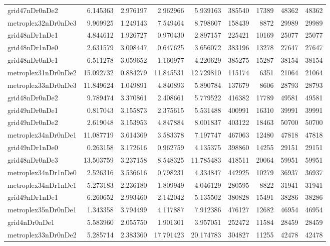 \begin{longtable}{|l|r|r|r|r|r|r|r|r|}
grid47nDr0nDe2 & 6.145363 & 2.976197 & 2.962966 & 5.939163 & 385540 & 17389 & 48362 & 48362 \\
metroplex32nDr0nDe3 & 9.969925 & 1.249143 & 7.549464 & 8.798607 & 158439 & 8872 & 29989 & 29989 \\
grid48nDr1nDe1 & 4.844612 & 1.926727 & 0.970430 & 2.897157 & 225421 & 10169 & 25077 & 25077 \\
grid48nDr1nDe0 & 2.631579 & 3.008447 & 0.647625 & 3.656072 & 383196 & 13278 & 27647 & 27647 \\
grid48nDr0nDe1 & 6.511278 & 3.059652 & 1.160977 & 4.220629 & 385275 & 15287 & 38154 & 38154 \\
metroplex31nDr0nDe2 & 15.092732 & 0.884279 & 11.845531 & 12.729810 & 115174 & 6351 & 21064 & 21064 \\
metroplex33nDr0nDe3 & 11.849624 & 1.049891 & 4.840893 & 5.890784 & 137679 & 8606 & 28793 & 28793 \\
grid48nDr0nDe2 & 9.789474 & 3.370861 & 2.408661 & 5.779522 & 416382 & 17789 & 49581 & 49581 \\
grid49nDr0nDe1 & 0.817043 & 3.155873 & 2.375615 & 5.531488 & 400991 & 16310 & 39991 & 39991 \\
grid49nDr0nDe2 & 2.619048 & 3.153953 & 4.847884 & 8.001837 & 403122 & 18463 & 50700 & 50700 \\
metroplex34nDr0nDe1 & 11.087719 & 3.614369 & 3.583378 & 7.197747 & 467063 & 12480 & 47818 & 47818 \\
grid49nDr1nDe0 & 0.263158 & 3.172616 & 0.962759 & 4.135375 & 398860 & 14255 & 29151 & 29151 \\
grid48nDr0nDe3 & 13.503759 & 3.237158 & 8.548325 & 11.785483 & 418511 & 20064 & 59951 & 59951 \\
metroplex34nDr1nDe0 & 2.526316 & 3.536616 & 0.798231 & 4.334847 & 442925 & 10279 & 36937 & 36937 \\
metroplex34nDr1nDe1 & 5.273183 & 2.236180 & 1.809949 & 4.046129 & 280595 & 8822 & 31941 & 31941 \\
grid49nDr1nDe1 & 6.260652 & 2.993460 & 2.142042 & 5.135502 & 380828 & 15491 & 38286 & 38286 \\
metroplex35nDr0nDe1 & 1.343358 & 3.794499 & 4.117887 & 7.912386 & 476127 & 12682 & 46954 & 46954 \\
grid4nDr0nDe1 & 5.583960 & 2.055750 & 1.901301 & 3.957051 & 252472 & 11584 & 28459 & 28459 \\
metroplex33nDr0nDe2 & 5.285714 & 2.383360 & 17.791423 & 20.174783 & 304827 & 11255 & 42478 & 42478 \\

\end{longtable}
